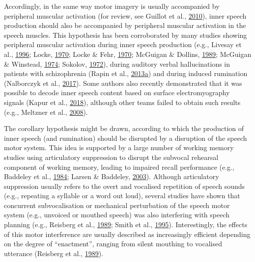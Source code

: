 \documentclass[a4paper,12pt,twoside,onecolumn,openright,final,oldfontcommands]{memoir}
\begin{document}
Accordingly, in the same way motor imagery is usually accompanied by peripheral muscular activation (for review, see Guillot et al., \protect\hyperlink{ref-guillot_electromyographic_2010}{2010}), inner speech production should also be accompanied by peripheral muscular activation in the speech muscles. This hypothesis has been corroborated by many studies showing peripheral muscular activation during inner speech production (e.g., Livesay et al., \protect\hyperlink{ref-livesay_covert_1996}{1996}; Locke, \protect\hyperlink{ref-locke_subvocal_1970-1}{1970}; Locke \& Fehr, \protect\hyperlink{ref-locke_subvocal_1970}{1970}; McGuigan \& Dollins, \protect\hyperlink{ref-mcguigan_patterns_1989}{1989}; McGuigan \& Winstead, \protect\hyperlink{ref-mcguigan_discriminative_1974}{1974}; Sokolov, \protect\hyperlink{ref-sokolov_inner_1972}{1972}), during auditory verbal hallucinations in patients with schizophrenia (Rapin et al., \protect\hyperlink{ref-rapin_emg_2013}{2013}\protect\hyperlink{ref-rapin_emg_2013}{a}) and during induced rumination (Nalborczyk et al., \protect\hyperlink{ref-nalborczyk_orofacial_2017}{2017}). Some authors also recently demonstrated that it was possible to decode inner speech content based on surface electromyography signals (Kapur et al., \protect\hyperlink{ref-kapur_alterego_2018}{2018}), although other teams failed to obtain such results (e.g., Meltzner et al., \protect\hyperlink{ref-meltzner_speech_2008}{2008}).

The corollary hypothesis might be drawn, according to which the production of inner speech (and rumination) should be disrupted by a disruption of the speech motor system. This idea is supported by a large number of working memory studies using articulatory suppression to disrupt the subvocal rehearsal component of working memory, leading to impaired recall performance (e.g., Baddeley et al., \protect\hyperlink{ref-baddeley_exploring_1984}{1984}; Larsen \& Baddeley, \protect\hyperlink{ref-larsen_disruption_2003}{2003}). Although articulatory suppression usually refers to the overt and vocalised repetition of speech sounds (e.g., repeating a syllable or a word out loud), several studies have shown that concurrent subvocalisation or mechanical perturbation of the speech motor system (e.g., unvoiced or mouthed speech) was also interfering with speech planning (e.g., Reisberg et al., \protect\hyperlink{ref-reisberg_enacted_1989}{1989}; Smith et al., \protect\hyperlink{ref-smith_role_1995}{1995}). Interestingly, the effects of this motor interference are usually described as increasingly efficient depending on the degree of \enquote{enactment}, ranging from silent mouthing to vocalised utterance (Reisberg et al., \protect\hyperlink{ref-reisberg_enacted_1989}{1989}).
\end{document}

